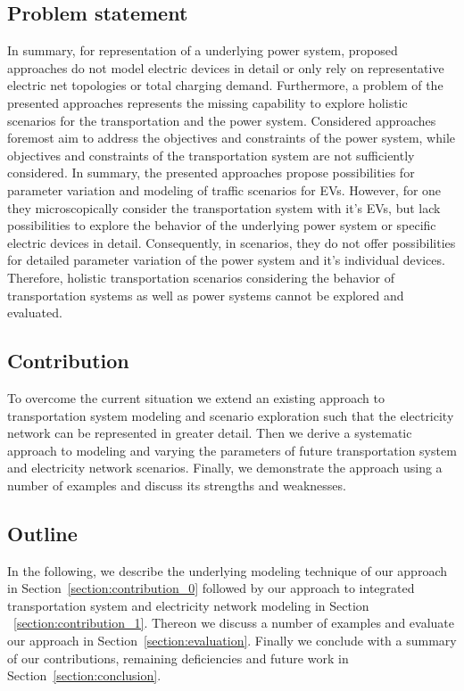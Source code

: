 \subsection{Problem statement}

In summary, for representation of a underlying power system, proposed approaches do not model electric devices in detail or only rely on representative electric net topologies or total charging demand. Furthermore, a problem of the presented approaches represents the missing capability to explore holistic scenarios for the transportation and the power system. Considered approaches foremost aim to address the objectives and constraints of the power system, while objectives and constraints of the transportation system are not sufficiently considered. In summary, the presented approaches propose possibilities for parameter variation and modeling of traffic scenarios for EVs. However, for one they microscopically consider the transportation system with it's EVs, but lack possibilities to explore the behavior of the underlying power system or specific electric devices in detail. Consequently, in scenarios, they do not offer possibilities for detailed parameter variation of the power system and it's individual devices. Therefore, holistic transportation scenarios considering the behavior of transportation systems as well as power systems cannot be explored and evaluated. %

\subsection{Contribution}

To overcome the current situation we extend an existing approach to transportation system modeling and scenario exploration such that the electricity network can be represented in greater detail. Then we derive a systematic approach to modeling and varying the parameters of future transportation system and electricity network scenarios. Finally, we demonstrate the approach using a number of examples and discuss its strengths and weaknesses.

\subsection{Outline}

In the following, we describe the underlying modeling technique of our approach in Section~\ref{section:contribution_0} followed by our approach to integrated transportation system and electricity network modeling in Section ~\ref{section:contribution_1}. Thereon we discuss a number of examples and evaluate our approach in Section~\ref{section:evaluation}. Finally we conclude with a summary of our contributions, remaining deficiencies and future work in Section~\ref{section:conclusion}.
